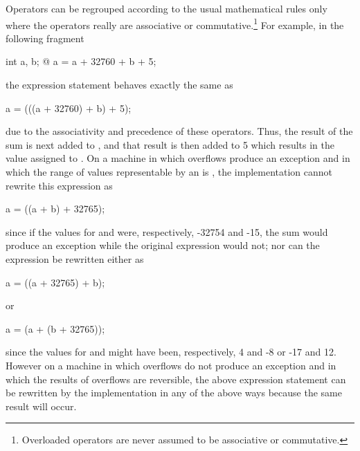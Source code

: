 \pnum
{}%
%
\begin{note} Operators can be regrouped according to the usual
mathematical rules only where the operators really are associative or
commutative.\footnote{Overloaded operators are never assumed to be associative or
commutative. }
For example, in the following fragment
\begin{codeblock}
int a, b;
@\commentellip@
a = a + 32760 + b + 5;
\end{codeblock}
the expression statement behaves exactly the same as
\begin{codeblock}
a = (((a + 32760) + b) + 5);
\end{codeblock}
due to the associativity and precedence of these operators. Thus, the
result of the sum  is next added to , and
that result is then added to 5 which results in the value assigned to
. On a machine in which overflows produce an exception and in
which the range of values representable by an  is
, the implementation cannot rewrite this
expression as
\begin{codeblock}
a = ((a + b) + 32765);
\end{codeblock}
since if the values for  and  were, respectively,
-32754 and -15, the sum  would produce an exception while
the original expression would not; nor can the expression be rewritten
either as
\begin{codeblock}
a = ((a + 32765) + b);
\end{codeblock}
or
\begin{codeblock}
a = (a + (b + 32765));
\end{codeblock}
since the values for  and  might have been,
respectively, 4 and -8 or -17 and 12. However on a machine in which
overflows do not produce an exception and in which the results of
overflows are reversible, the above expression statement can be
rewritten by the implementation in any of the above ways because the
same result will occur. \end{note}

